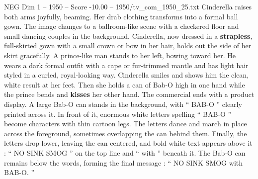 \begin{textsample}{NEG Dim 1 – 1950 – Score -10.00 – 1950/tv\_com\_1950\_25.txt}
Cinderella raises both arms joyfully, beaming.
Her drab clothing transforms into a formal ball gown.
The image changes to a ballroom-like scene with a checkered floor and small dancing couples in the background.
Cinderella, now dressed in a \textbf{strapless}, full-skirted gown with a small crown or bow in her hair, holds out the side of her skirt gracefully.
A prince-like man stands to her left, bowing toward her.
He wears a dark formal outfit with a cape or fur-trimmed mantle and has light hair styled in a curled, royal-looking way.
Cinderella smiles and shows him the clean, white result at her feet.
Then she holds a can of Bab-O high in one hand while the prince bends and \textbf{kisses} her other hand.
The commercial ends with a product display.
A large Bab-O can stands in the background, with “ BAB-O ” clearly printed across it.
In front of it, enormous white letters spelling “ BAB-O ” become characters with thin cartoon legs.
The letters dance and march in place across the foreground, sometimes overlapping the can behind them.
Finally, the letters drop lower, leaving the can centered, and bold white text appears above it : “ NO SINK SMOG ” on the top line and “ with ” beneath it.
The Bab-O can remains below the words, forming the final message : “ NO SINK SMOG with BAB-O. ”

\end{textsample}
